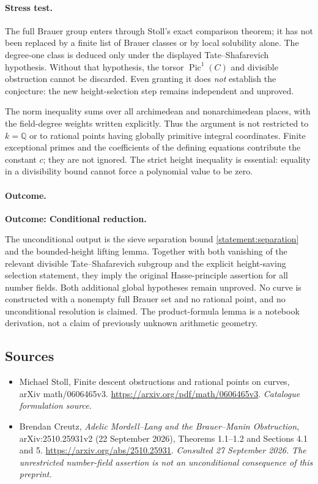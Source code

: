\documentclass[11pt,a4paper]{article}
\newcommand{\Q}{\mathbb{Q}}
\begin{document}
\paragraph{Stress test.}
The full Brauer group enters through Stoll's exact comparison theorem;
it has not been replaced by a finite list of Brauer classes or by local
solubility alone. The degree-one class is deduced only under the displayed
Tate--Shafarevich hypothesis. Without that hypothesis, the torsor
$\operatorname{Pic}^1(C)$ and divisible obstruction cannot be discarded.
Even granting it does \emph{not} establish the conjecture: the new
height-selection step remains independent and unproved.

The norm inequality sums over all archimedean and nonarchimedean places,
with the field-degree weights written explicitly. Thus the argument is
not restricted to $k=\Q$ or to rational points having globally primitive
integral coordinates. Finite exceptional primes and the coefficients of
the defining equations contribute the constant $c$; they are not ignored.
The strict height inequality is essential: equality in a divisibility
bound cannot force a polynomial value to be zero.

\paragraph{Outcome.}
\textbf{Outcome: Conditional reduction.}

The unconditional output is the sieve separation bound
\eqref{statement:separation} and the bounded-height lifting lemma. Together with
both vanishing of the relevant divisible Tate--Shafarevich subgroup and
the explicit height-saving selection statement, they imply the original
Hasse-principle assertion for all number fields. Both additional global
hypotheses remain unproved. No curve is constructed with a nonempty full
Brauer set and no rational point, and no unconditional resolution is
claimed. The product-formula lemma is a notebook derivation, not a claim
of previously unknown arithmetic geometry.
\subsection{Sources}
\begin{itemize}\raggedright
\item[\textnormal{[S1]}]\hypertarget{source:statement:1}{} Michael Stoll, Finite descent obstructions and rational points on curves, arXiv math/0606465v3.
\url{https://arxiv.org/pdf/math/0606465v3}.
{\small\textit{Catalogue formulation source.}}
\item[\textnormal{[E1]}]\hypertarget{extra:statement:1}{} Brendan Creutz,
\emph{Adelic Mordell--Lang and the Brauer--Manin Obstruction},
arXiv:2510.25931v2 (22 September 2026), Theorems 1.1--1.2 and Sections 4.1 and 5.
\url{https://arxiv.org/abs/2510.25931}.
{\small\textit{Consulted 27 September 2026. The unrestricted number-field assertion is not an unconditional consequence of this preprint.}}
\end{itemize}
\end{document}
